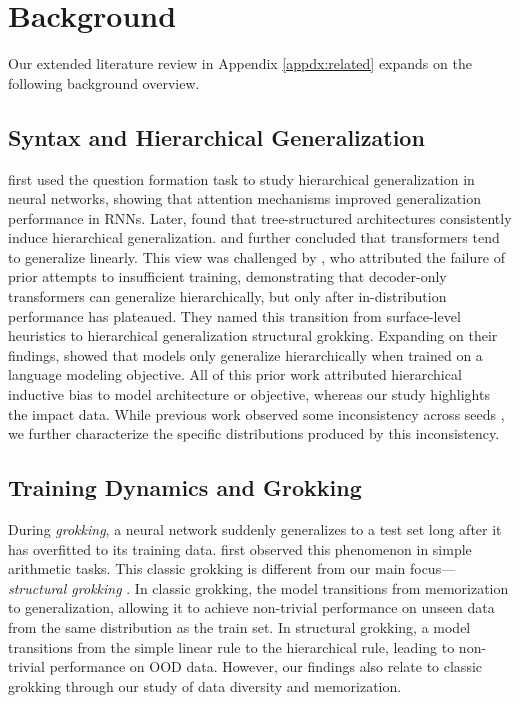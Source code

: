 \section{Background}
Our extended literature review in Appendix \ref{appdx:related} expands on the following background overview.


\subsection{Syntax and Hierarchical Generalization}
\label{sec:syntax_related}
\citet{McCoy2018-uv} first used the question formation task to study hierarchical generalization in neural networks, showing that attention mechanisms improved generalization performance in RNNs. Later, \citet{McCoy2020-pj} found that tree-structured architectures consistently induce hierarchical generalization. \citet{Petty2021-pe} and \citet{Mueller2022-rm} further concluded that  transformers tend to generalize linearly. This view was challenged by \citet{Murty2023-xp}, who attributed the failure of prior attempts to insufficient training, demonstrating that decoder-only transformers can generalize hierarchically, but only after in-distribution performance has plateaued. They named this transition from surface-level heuristics to hierarchical generalization structural grokking. Expanding on their findings, \citet{Ahuja2024-ul} showed that models only generalize hierarchically when trained on a language modeling objective. All of this prior work attributed hierarchical inductive bias to model architecture or objective, whereas our study highlights the impact data. 
While previous work observed some inconsistency across seeds \citep{McCoy2018-uv, McCoyUnknown-uy}, we further characterize the specific distributions produced by this inconsistency. 


\subsection{Training Dynamics and Grokking}
During \textit{grokking}, a neural network suddenly generalizes to a test set long after it has overfitted to its training data. \citet{Power2022-hz} first observed this phenomenon in simple arithmetic tasks. 
This classic grokking is different from our main focus---\textit{structural grokking} \citep{Murty2023-xp}. In classic grokking, the model transitions from memorization to generalization, allowing it to achieve non-trivial performance on unseen data from the same distribution as the train set. In structural grokking, a model transitions from the simple linear rule to the hierarchical rule, leading to non-trivial performance on OOD data. However, our findings also relate to classic grokking through our study of data diversity and memorization. 

